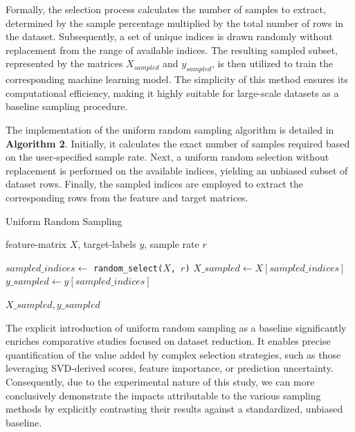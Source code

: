 \documentclass{article}
\theoremstyle{plain}
\theoremstyle{definition}
\theoremstyle{remark}
\begin{document}
Formally, the selection process calculates the number of samples to extract, determined by the sample percentage multiplied by the total number of rows in the dataset. Subsequently, a set of unique indices is drawn randomly without replacement from the range of available indices. The resulting sampled subset, represented by the matrices $X_{sampled}$ and $y_{sampled}$, is then utilized to train the corresponding machine learning model. The simplicity of this method ensures its computational efficiency, making it highly suitable for large-scale datasets as a baseline sampling procedure.

The implementation of the uniform random sampling algorithm is detailed in \textbf{Algorithm 2}. Initially, it calculates the exact number of samples required based on the user-specified sample rate. Next, a uniform random selection without replacement is performed on the available indices, yielding an unbiased subset of dataset rows. Finally, the sampled indices are employed to extract the corresponding rows from the feature and target matrices.

\begin{algorithm}[tb]
	\caption{Uniform Random Sampling}
	\label{alg:random_alg}
	\begin{algorithmic}
		 feature-matrix $X$, target-labels $y$, sample rate $r$
		
		\vspace{0.25cm}
		
		\STATE $sampled\_indices \leftarrow$ \texttt{random\_select($X$, $r$)}
		\STATE $X\_sampled \leftarrow X[sampled\_indices]$
		\STATE $y\_sampled \leftarrow y[sampled\_indices]$
		
		\vspace{0.25cm}
		
		 \texttt{$X\_sampled, y\_sampled$}
	\end{algorithmic}
\end{algorithm}


The explicit introduction of uniform random sampling as a baseline significantly enriches comparative studies focused on dataset reduction. It enables precise quantification of the value added by complex selection strategies, such as those leveraging SVD-derived scores, feature importance, or prediction uncertainty. Consequently, due to the experimental nature of this study, we can more conclusively demonstrate the impacts attributable to the various sampling methods by explicitly contrasting their results against a standardized, unbiased baseline.
\end{document}
